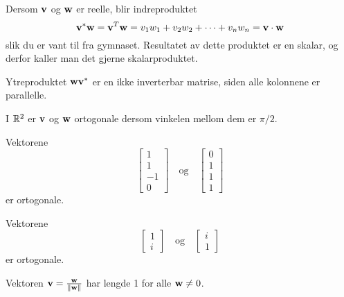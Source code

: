  
 \begin{merkx}
 Dersom $\mathbf{v}$ og $\mathbf{w}$ er reelle, blir indreproduktet 
\[
\mathbf{v}^* \mathbf{w}=\mathbf{v}^T\mathbf{w}= v_1w_1 + v_2w_2 + \cdots +v_nw_n=\mathbf{v}\cdot  \mathbf{w}
 \] 
 slik du er vant til fra gymnaset. Resultatet av dette produktet er en skalar, og derfor kaller man det gjerne skalarproduktet.  
 \end{merkx}
 
 \begin{merkx}
 Ytreproduktet $ \mathbf{w} \mathbf{v}^*$ er en ikke inverterbar matrise, siden alle kolonnene er parallelle.
 \end{merkx}
 
 

 \begin{ex}
I $\mathbb{R}^2$ er $\mathbf{v}$ og $\mathbf{w}$ ortogonale dersom vinkelen mellom dem er $\pi/2$.
\end{ex}


 \begin{ex}
 Vektorene 
 \[
 \begin{bmatrix}
 1 \\ 
 1 \\
 -1\\
 0
 \end{bmatrix}
 \quad
 \text{og}
 \quad
  \begin{bmatrix}
 0 \\ 
 1 \\
 1\\
 1
 \end{bmatrix}
\]
er ortogonale. 
 \end{ex}

 \begin{ex}
 Vektorene 
 \[
 \begin{bmatrix}
 1 \\ 
 i 
 \end{bmatrix}
 \quad
 \text{og}
 \quad
  \begin{bmatrix}
 i \\ 
1
 \end{bmatrix}
\]
er ortogonale. 
 \end{ex}


 \begin{ex}
 Vektoren $\mathbf{v}=\frac{\mathbf{w}}{\|\mathbf{w}\|}$ har lengde 1 for alle $\mathbf{w} \neq 0$.
 \end{ex}
 

